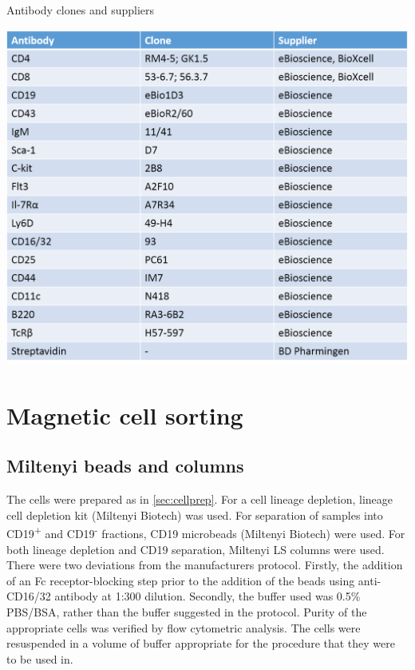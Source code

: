\begin{table}
\caption{Antibody clones and suppliers}
\includegraphics[width=\textwidth]{Figures/NewAntibodyclones.png}
\label{fig:antibodyclones}
\end{table}

\section{Magnetic cell sorting}
\label{Methods:MACSdepletion}

\subsection{Miltenyi beads and columns}
\label{subsec:Miltenyibeads}

The cells were prepared as in \cref{sec:cellprep}.
For a cell lineage depletion, lineage cell depletion kit (Miltenyi Biotech) was used.
For separation of samples into CD19\textsuperscript{+} and CD19\textsuperscript{-} fractions, CD19 microbeads (Miltenyi Biotech) were used.
For both lineage depletion and CD19 separation, Miltenyi LS columns were used. %
There were two deviations from the manufacturers protocol.
Firstly, the addition of an Fc receptor-blocking step prior to the addition of the beads using anti-CD16/32 antibody at 1:300 dilution.
Secondly, the buffer used was 0.5\% PBS/BSA, rather than the buffer suggested in the protocol.
Purity of the appropriate cells was verified by flow cytometric analysis.
The cells were resuspended in a volume of buffer appropriate for the procedure that they were to be used in.

